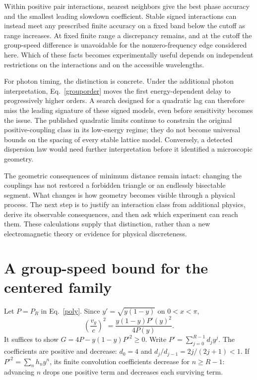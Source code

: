 \documentclass[11pt]{article}
\begin{document}
Within positive pair interactions, nearest neighbors give the best phase accuracy and the smallest leading slowdown coefficient. Stable signed interactions can instead meet any prescribed finite accuracy on a fixed band below the cutoff as range increases. At fixed finite range a discrepancy remains, and at the cutoff the group-speed difference is unavoidable for the nonzero-frequency edge considered here. Which of these facts becomes experimentally useful depends on independent restrictions on the interactions and on the accessible wavelengths.

For photon timing, the distinction is concrete. Under the additional photon interpretation, Eq.~\eqref{grouporder} moves the first energy-dependent delay to progressively higher orders. A search designed for a quadratic lag can therefore miss the leading signature of these signed models, even before sensitivity becomes the issue. The published quadratic limits continue to constrain the original positive-coupling class in its low-energy regime; they do not become universal bounds on the spacing of every stable lattice model. Conversely, a detected dispersion law would need further interpretation before it identified a microscopic geometry.

The geometric consequences of minimum distance remain intact: changing the couplings has not restored a forbidden triangle or an endlessly bisectable segment. What changes is how geometry becomes visible through a physical process. The next step is to justify an interaction class from additional physics, derive its observable consequences, and then ask which experiment can reach them. These calculations supply that distinction, rather than a new electromagnetic theory or evidence for physical discreteness.

\clearpage
\appendix
\section{A group-speed bound for the centered family}\label{app:speed}
Let $P=P_R$ in Eq.~\eqref{poly}. Since $y'=\sqrt{y(1-y)}$ on $0<x<\pi$,
\begin{equation}
 \left(\frac{v_g}{c}\right)^2=\frac{y(1-y)P'(y)^2}{4P(y)}.
\end{equation}
It suffices to show $G=4P-y(1-y)P'^2\geq0$. Write $P'=\sum_{j=0}^{R-1}d_jy^j$. The coefficients are positive and decrease: $d_0=4$ and $d_j/d_{j-1}=2j/(2j+1)<1$. If $P'^2=\sum_n h_ny^n$, its finite convolution coefficients decrease for $n\geq R-1$: advancing $n$ drops one positive term and decreases each surviving term.
\end{document}

